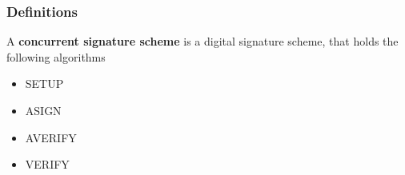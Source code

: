 \begin{frame}
	\frametitle{Definitions}

	\begin{definition}
		A \textbf{concurrent signature scheme} is a digital signature scheme, that holds the following algorithms
		\begin{itemize}
			\item SETUP
			\item ASIGN
			\item AVERIFY
			\item VERIFY
		\end{itemize}
	\end{definition}
\end{frame}
